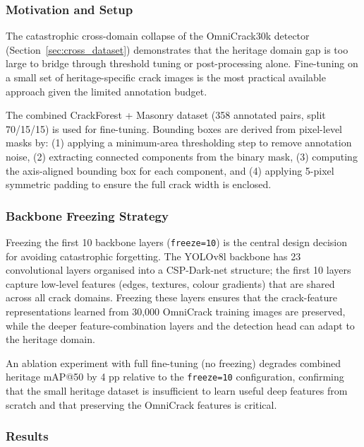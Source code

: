 \documentclass[12pt,a4paper]{article}
\begin{document}
\subsubsection{Motivation and Setup}

The catastrophic cross-domain collapse of the OmniCrack30k detector (Section~\ref{sec:cross_dataset}) demonstrates that the heritage domain gap is too large to bridge through threshold tuning or post-processing alone. Fine-tuning on a small set of heritage-specific crack images is the most practical available approach given the limited annotation budget.

The combined CrackForest + Masonry dataset (358 annotated pairs, split 70/15/15) is used for fine-tuning. Bounding boxes are derived from pixel-level masks by: (1) applying a minimum-area thresholding step to remove annotation noise, (2) extracting connected components from the binary mask, (3) computing the axis-aligned bounding box for each component, and (4) applying 5-pixel symmetric padding to ensure the full crack width is enclosed.

\subsubsection{Backbone Freezing Strategy}

Freezing the first 10 backbone layers (\texttt{freeze=10}) is the central design decision for avoiding catastrophic forgetting. The YOLOv8l backbone has 23 convolutional layers organised into a CSP-Dark-net structure; the first 10 layers capture low-level features (edges, textures, colour gradients) that are shared across all crack domains. Freezing these layers ensures that the crack-feature representations learned from 30,000 OmniCrack training images are preserved, while the deeper feature-combination layers and the detection head can adapt to the heritage domain.

An ablation experiment with full fine-tuning (no freezing) degrades combined heritage mAP@50 by 4 pp relative to the \texttt{freeze=10} configuration, confirming that the small heritage dataset is insufficient to learn useful deep features from scratch and that preserving the OmniCrack features is critical.

\subsubsection{Results}
\end{document}
